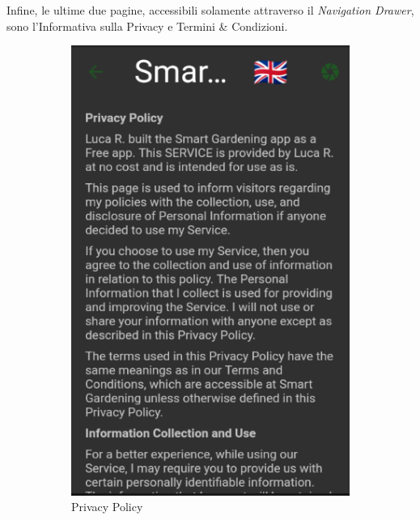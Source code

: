 \documentclass[a4paper,12pt]{report}
\begin{document}
\textsf{\small Infine, le ultime due pagine, accessibili solamente attraverso il \emph{Navigation Drawer}, sono l'Informativa sulla Privacy e Termini \& Condizioni.}

\begin{figure}[H]	
	\begin{subfigure}{0.3\textwidth}
		\includegraphics[width=\textwidth]{./images/privacy_policy/privacy_policy_screen.png}
		\caption{Privacy Policy}
		\label{fig:privacy_policy}
	\end{subfigure}
	\hfill
	\begin{subfigure}{0.3\textwidth}

\end{subfigure}
\end{figure}
\end{document}
